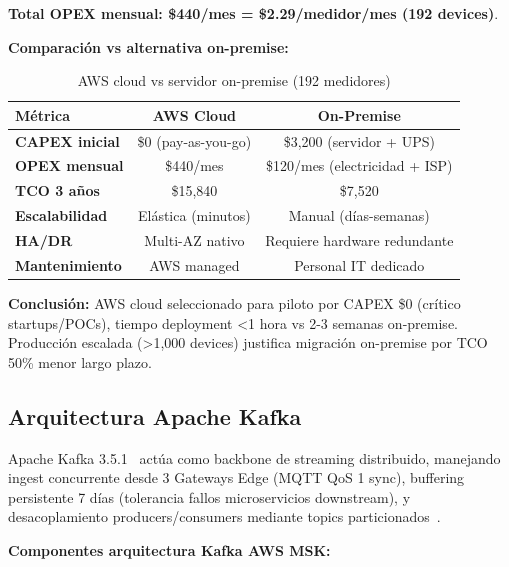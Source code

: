 \textbf{Total OPEX mensual: \$440/mes = \$2.29/medidor/mes (192 devices)}.

\textbf{Comparación vs alternativa on-premise:}

\begin{table}[H]
\centering
\caption{AWS cloud vs servidor on-premise (192 medidores)}
\label{tab:server-aws-vs-onprem}
\small
\begin{tabular}{|l|c|c|}
\hline
\textbf{Métrica} & \textbf{AWS Cloud} & \textbf{On-Premise} \\
\hline
\textbf{CAPEX inicial} & \$0 (pay-as-you-go) & \$3,200 (servidor + UPS) \\
\textbf{OPEX mensual} & \$440/mes & \$120/mes (electricidad + ISP) \\
\textbf{TCO 3 años} & \$15,840 & \$7,520 \\
\textbf{Escalabilidad} & Elástica (minutos) & Manual (días-semanas) \\
\textbf{HA/DR} & Multi-AZ nativo & Requiere hardware redundante \\
\textbf{Mantenimiento} & AWS managed & Personal IT dedicado \\
\hline
\end{tabular}
\end{table}

\textbf{Conclusión:} AWS cloud seleccionado para piloto por CAPEX \$0 (crítico startups/POCs), tiempo deployment <1 hora vs 2-3 semanas on-premise. Producción escalada (>1,000 devices) justifica migración on-premise por TCO 50\% menor largo plazo.

\subsection{Arquitectura Apache Kafka}
\label{sec:server-kafka}

Apache Kafka 3.5.1~\cite{apacheKafkaDocumentation2024} actúa como backbone de streaming distribuido, manejando ingest concurrente desde 3 Gateways Edge (MQTT QoS 1 sync), buffering persistente 7 días (tolerancia fallos microservicios downstream), y desacoplamiento producers/consumers mediante topics particionados~\cite{kraborKafkaPerformanceScalability2023}.

\textbf{Componentes arquitectura Kafka AWS MSK:}

